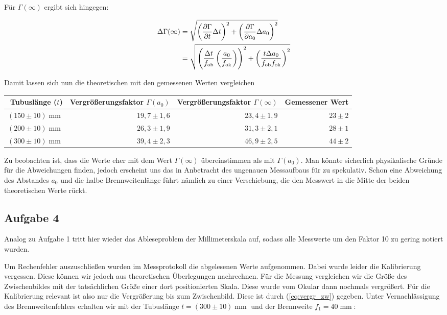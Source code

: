 \documentclass[a4paper,german,12pt,smallheadings]{scrartcl}
\begin{document}
Für $\Gamma(\infty)$ ergibt sich hingegen:

\begin{align*}
  \Delta \Gamma(\infty) &= \sqrt{
    \del{\frac{\partial \Gamma}{\partial t} \Delta t}^2 +
    \del{\frac{\partial \Gamma}{\partial a_0} \Delta a_0}^2
  } \\
  &= \sqrt{
    \del{
      \frac{\Delta t}{f_\text{ob}} \del{
        \frac{a_0}{f_\text{ok}}
      }
    }^2 +
    \del{
      \frac{t \Delta a_0}{f_\text{ob} f_\text{ok}}
    }^2
  }
\end{align*}

Damit lassen sich nun die theoretischen mit den gemessenen Werten vergleichen

\hspace{5 mm}

\begin{tabular}{ r | r | r | r}
  Tubuslänge ($t$) & Vergrößerungsfaktor $\Gamma(a_0)$ & Vergrößerungsfaktor $\Gamma(\infty)$ & Gemessener Wert \\
  \hline
  $(150\pm10) \operatorname{mm}$ & $19{,}7\pm1{,}6$ & $23{,}4\pm1{,}9$ & $23\pm2$ \\
  $(200\pm10) \operatorname{mm}$ & $26{,}3\pm1{,}9$ & $31{,}3\pm2{,}1$ & $28\pm1$ \\
  $(300\pm10) \operatorname{mm}$ & $39{,}4\pm2{,}3$ & $46{,}9\pm2{,}5$ & $44\pm2$ \\
\end{tabular}

\hspace{5mm}

Zu beobachten ist, dass die Werte eher mit dem Wert $\Gamma(\infty)$
übereinstimmen als mit $\Gamma(a_0)$. Man könnte sicherlich physikalische
Gründe für die Abweichungen finden, jedoch erscheint uns das in Anbetracht
des ungenauen Messaufbaus für zu spekulativ. Schon eine Abweichung des
Abstandes $a_0$ und die halbe Brennweitenlänge führt nämlich zu einer
Verschiebung, die den Messwert in die Mitte der beiden theoretischen Werte
rückt.

\subsection{Aufgabe 4}
Analog zu Aufgabe 1 tritt hier wieder das Ableseproblem der Millimeterskala
auf, sodass alle Messwerte um den Faktor 10 zu gering notiert wurden.

Um Rechenfehler auszuschließen wurden im Messprotokoll die abgelesenen Werte
aufgenommen. Dabei wurde leider die Kalibrierung vergessen. Diese können wir
jedoch aus theoretischen Überlegungen nachrechnen. Für die Messung vergleichen
wir die Größe des Zwischenbildes mit der tatsächlichen Größe einer dort
positionierten Skala. Diese wurde vom Okular dann nochmals vergrößert. Für
die Kalibrierung relevant ist also nur die Vergrößerung bis zum Zwischenbild.
Diese ist durch (\ref{eq:vergr_zw}) gegeben. Unter Vernachlässigung des
Brennweitenfehlers erhalten wir mit der Tubuslänge $t = (300\pm10)
\operatorname{mm}$ und der Brennweite $f_1 = 40 \operatorname{mm}$:
\end{document}
